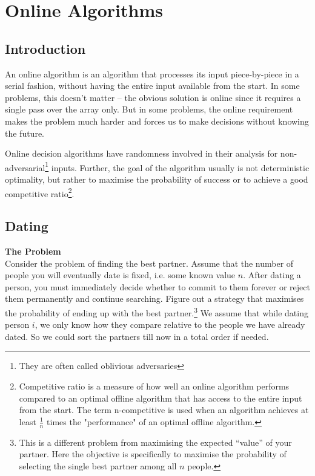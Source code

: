 
\chapter{Online Algorithms}

\section{Introduction}

An online algorithm is an algorithm that processes its input piece-by-piece in a serial fashion,
 without having the entire input available from the start. In some problems, this doesn't matter -- 
 the obvious solution is online since it requires a single pass over the array only. But in some problems, 
 the online requirement makes the problem much harder and forces us to make decisions without knowing the future.

Online decision algorithms have randomness involved in their analysis for non-adversarial\footnote{They 
are often called oblivious adversaries} inputs. 
Further, the goal of the algorithm usually is not deterministic optimality, but rather to maximise the probability of 
success or to achieve a good competitive ratio\footnote{Competitive ratio is a measure of how well an online algorithm 
performs compared to an optimal offline algorithm that has access to the entire input from the start. The term n-competitive 
is used when an algorithm achieves at least $\frac{1}{n}$ times the "performance" of an optimal offline algorithm.}.

\section{Dating}

\textbf{The Problem}\\

Consider the problem of finding the best partner. Assume that 
the number of people you will eventually date is fixed, i.e. some known value \(n\). After 
dating a person, you must immediately decide whether to commit to them forever or reject 
them permanently and continue searching. Figure out a strategy that maximises the 
probability of ending up with the best partner.\footnote{This is a different 
problem from maximising the expected ``value'' of your partner. Here the objective 
is specifically to maximise the probability of selecting the single best partner 
among all \(n\) people.} We assume that while dating person \(i\), we only know how 
they compare relative to the people we have already dated. So we could sort the 
partners till now in a total order if needed.\\


